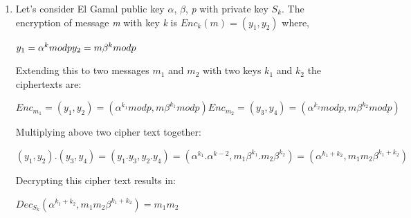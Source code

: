 \documentclass{article}
\begin{document}
        \begin{enumerate}
            \item 
                Let's consider El Gamal public key $\alpha$, $\beta$, \emph{p} with private key $S_k$. The encryption of message \emph{m} with key \emph{k} is $Enc_k(m) = (y_1,y_2)$ where, 
                    \begin{center}
                        \begin{math}
                            {y_1} = \alpha^k mod p \newline
                            {y_2} = m\beta^k mod p
                        \end{math}
                    \end{center}
                    
                Extending this to two messages $m_1$ and $m_2$ with two keys $k_1$ and $k_2$ the ciphertexts are:
                    \begin{center}
                        \begin{math}
                            Enc_{m_1} = (y_1,y_2) = (\alpha^{k_1}mod p, m\beta^{k_1}mod p)
                            Enc_{m_2} = (y_3,y_4) = (\alpha^{k_2}mod p, m\beta^{k_2}mod p)
                        \end{math}
                    \end{center}
                    
                Multiplying above two cipher text together:
                    \begin{center}
                        \begin{math}
                            (y_1,y_2).(y_3,y_4) = (y_1.y_3,y_2.y_4) = (\alpha^{k_1}.\alpha^{k-2},m_1{\beta^{k_1}}.m_2{\beta^{k_2}}) = (\alpha^{k_1+k_2}, {m_1}{m_2}\beta^{k_1+k_2})
                        \end{math}
                    \end{center}
                    
                Decrypting this cipher text results in:
                    \begin{center}
                        \begin{math}
                            Dec_{S_k}(\alpha^{k_1+k_2},{m_1}{m_2}\beta^{k_1+k_2}) = m_1m_2
                        \end{math}
                    \end{center}
                \citep{homomorphicprof}
            

\end{enumerate}
\end{document}
